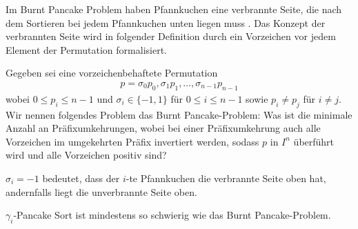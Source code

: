 \documentclass[a4paper, 11pt, ngerman]{article}
\begin{document}
Im Burnt Pancake Problem haben Pfannkuchen eine verbrannte Seite, die nach dem Sortieren bei jedem Pfannkuchen unten liegen muss \cite{burntpancakes}. Das Konzept der verbrannten Seite wird in folgender Definition durch ein Vorzeichen vor jedem Element der Permutation formalisiert.
\begin{definition}
    Gegeben sei eine vorzeichenbehaftete Permutation
    \begin{align*}
        p = \sigma_0 p_0, \sigma_1 p_1, \dots, \sigma_{n-1} p_{n-1}
    \end{align*}
    wobei $0 \le p_i \le n-1$ und $\sigma_i \in \{-1, 1\}$ für $0 \le i \le n - 1$ sowie $p_i \ne p_j$ für $i \ne j$. Wir nennen folgendes Problem das Burnt Pancake-Problem: Was ist die minimale Anzahl an Präfixumkehrungen, wobei bei einer Präfixumkehrung auch alle Vorzeichen im umgekehrten Präfix invertiert werden, sodass $p$ in $I^n$ überführt wird und alle Vorzeichen positiv sind?
\end{definition}
$\sigma_i = -1$ bedeutet, dass der $i$-te Pfannkuchen die verbrannte Seite oben hat, andernfalls liegt die unverbrannte Seite oben.

\begin{theorem}
    $\gamma_i$-Pancake Sort ist mindestens so schwierig wie das Burnt Pancake-Problem.
\end{theorem}
\end{document}
